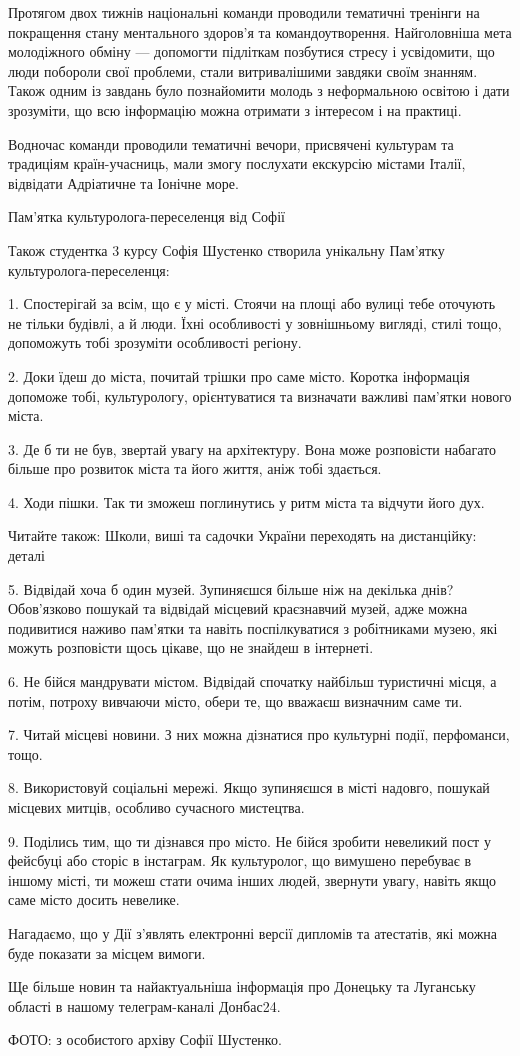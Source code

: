 Протягом двох тижнів національні команди проводили тематичні тренінги на
покращення стану ментального здоров'я та командоутворення. Найголовніша мета
молодіжного обміну — допомогти підліткам позбутися стресу і усвідомити, що люди
побороли свої проблеми, стали витривалішими завдяки своїм знанням. Також одним
із завдань було познайомити молодь з неформальною освітою і дати зрозуміти, що
всю інформацію можна отримати з інтересом і на практиці.

Водночас команди проводили тематичні вечори, присвячені культурам та традиціям
країн-учасниць, мали змогу послухати екскурсію містами Італії, відвідати
Адріатичне та Іонічне море.

Пам'ятка культуролога-переселенця від Софії

Також студентка 3 курсу Софія Шустенко створила унікальну Пам'ятку
культуролога-переселенця:

1. Спостерігай за всім, що є у місті. Стоячи на площі або вулиці тебе оточують
не тільки будівлі, а й люди. Їхні особливості у зовнішньому вигляді, стилі
тощо, допоможуть тобі зрозуміти особливості регіону.

2. Доки їдеш до міста, почитай трішки про саме місто. Коротка інформація
допоможе тобі, культурологу, орієнтуватися та визначати важливі пам'ятки нового
міста.

3. Де б ти не був, звертай увагу на архітектуру. Вона може розповісти набагато
більше про розвиток міста та його життя, аніж тобі здається.

4. Ходи пішки. Так ти зможеш поглинутись у ритм міста та відчути його дух.

Читайте також: Школи, виші та садочки України переходять на дистанційку: деталі

5. Відвідай хоча б один музей. Зупиняєшся більше ніж на декілька днів?
Обов'язково пошукай та відвідай місцевий краєзнавчий музей, адже можна
подивитися наживо пам'ятки та навіть поспілкуватися з робітниками музею, які
можуть розповісти щось цікаве, що не знайдеш в інтернеті.

6. Не бійся мандрувати містом. Відвідай спочатку найбільш туристичні місця, а
потім, потроху вивчаючи місто, обери те, що вважаєш визначним саме ти.

7. Читай місцеві новини. З них можна дізнатися про культурні події, перфоманси,
тощо.

8. Використовуй соціальні мережі. Якщо зупиняєшся в місті надовго, пошукай
місцевих митців, особливо сучасного мистецтва.

9. Поділись тим, що ти дізнався про місто. Не бійся зробити невеликий пост у
фейсбуці або сторіс в інстаграм. Як культуролог, що вимушено перебуває в іншому
місті, ти можеш стати очима інших людей, звернути увагу, навіть якщо саме місто
досить невелике.

Нагадаємо, що у Дії з'являть електронні версії дипломів та атестатів, які можна
буде показати за місцем вимоги.

Ще більше новин та найактуальніша інформація про Донецьку та Луганську області
в нашому телеграм-каналі Донбас24.

ФОТО: з особистого архіву Софії Шустенко.
